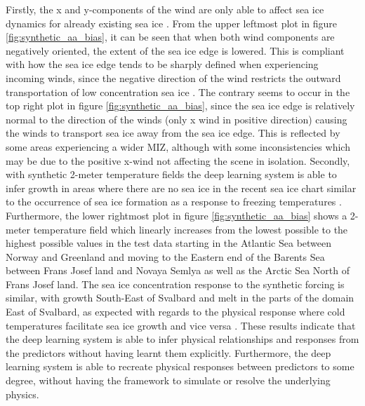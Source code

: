 \documentclass[../main/thesis]{subfiles}
\begin{document}
Firstly, the x and y-components of the wind are only able to affect sea ice dynamics for already existing sea ice \citep{Spreen2011, Yu2020}. From the upper leftmost plot in figure \ref{fig:synthetic_aa_bias}, it can be seen that when both wind components are negatively oriented, the extent of the sea ice edge is lowered. This is compliant with how the sea ice edge tends to be sharply defined when experiencing incoming winds, since the negative direction of the wind restricts the outward transportation of low concentration sea ice \citep{Yu2020}. The contrary seems to occur in the top right plot in figure \ref{fig:synthetic_aa_bias}, since the sea ice edge is relatively normal to the direction of the winds (only x wind in positive direction) causing the winds to transport sea ice away from the sea ice edge. This is reflected by some areas experiencing a wider MIZ, although with some inconsistencies which may be due to the positive x-wind not affecting the scene in isolation. Secondly, with synthetic 2-meter temperature fields the deep learning system is able to infer growth in areas where there are no sea ice in the recent sea ice chart similar to the occurrence of sea ice formation as a response to freezing temperatures \citep{Hibler1979}. Furthermore, the lower rightmost plot in figure \ref{fig:synthetic_aa_bias} shows a 2-meter temperature field which linearly increases from the lowest possible to the highest possible values in the test data starting in the Atlantic Sea between Norway and Greenland and moving to the Eastern end of the Barents Sea between Frans Josef land and Novaya Semlya as well as the Arctic Sea North of Frans Josef land. The sea ice concentration response to the synthetic forcing is similar, with growth South-East of Svalbard and melt in the parts of the domain East of Svalbard, as expected with regards to the physical response where cold temperatures facilitate sea ice growth and vice versa \citep{Hibler1979}. These results indicate that the deep learning system is able to infer physical relationships and responses from the predictors without having learnt them explicitly. Furthermore, the deep learning system is able to recreate physical responses between predictors to some degree, without having the framework to simulate or resolve the underlying physics.
\end{document}
